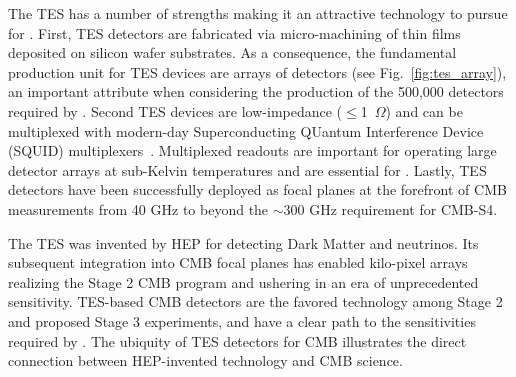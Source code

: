 The TES has a number of strengths making it an attractive technology to
pursue for \cmbexp. First, TES detectors are fabricated via
micro-machining of thin films deposited on silicon wafer
substrates. As a consequence, the fundamental production unit for TES
devices are arrays of detectors (see Fig.~\ref{fig:tes_array}), an
important attribute when considering the production of the 500,000
detectors required by \cmbexp.  Second TES devices are low-impedance
($\le$1~$\Omega$) and can be multiplexed with modern-day
Superconducting QUantum Interference Device (SQUID)
multiplexers~\cite{fmux,tmux,umux}. Multiplexed readouts are important
for operating large detector arrays at sub-Kelvin temperatures and are
essential for \cmbexp. Lastly, TES detectors have been successfully
deployed as focal planes at the forefront of CMB measurements from 40 GHz
to beyond the $\sim 300$ GHz requirement for CMB-S4.



The TES was invented by HEP for detecting Dark Matter and
neutrinos. Its subsequent integration into CMB focal planes has
enabled kilo-pixel arrays realizing the Stage 2 CMB program and
ushering in an era of unprecedented sensitivity. TES-based CMB
detectors are the favored technology among Stage 2 and proposed Stage
3 experiments, and have a clear path to the sensitivities required
by \cmbexp. The ubiquity of TES detectors for CMB illustrates the
direct connection between HEP-invented technology and CMB science.


